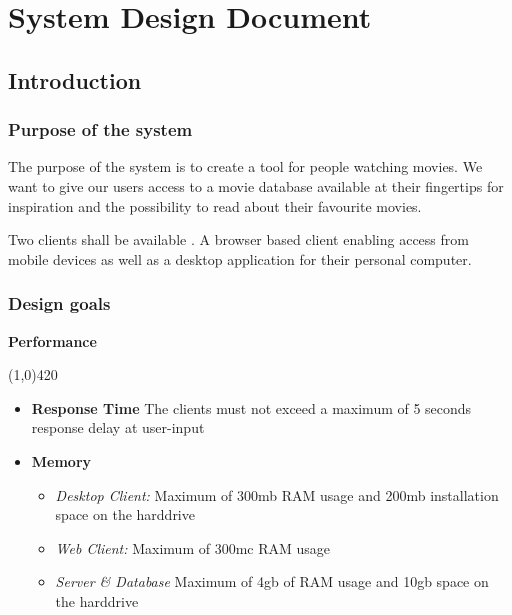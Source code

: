 \chapter{System Design Document}

\section{Introduction}
\label{sec:introduction}


\subsection{Purpose of the system}
The purpose of the system is to create a tool for people watching movies. We want to give our users access to a movie database available at their fingertips for inspiration and the possibility to read about their favourite movies.

Two clients shall be available . A browser based client enabling access from mobile devices as well as a desktop application for their personal computer.  




\subsection{Design goals}

\textbf{Performance}
\vspace{-1.1cm}
\begin{center}
\line(1,0){420}
\end{center}


\begin{itemize}
\item \textbf{Response Time} The clients must not exceed a maximum of 5 seconds response delay at user-input
\item \textbf{Memory} 
\begin{itemize}
\item \emph{Desktop Client:} Maximum of 300mb RAM usage and 200mb installation space on the harddrive
\item \emph{Web Client:} Maximum of 300mc RAM usage
\item \emph{Server \& Database} Maximum of 4gb of RAM usage and 10gb space on the harddrive
\end{itemize}
\end{itemize}


